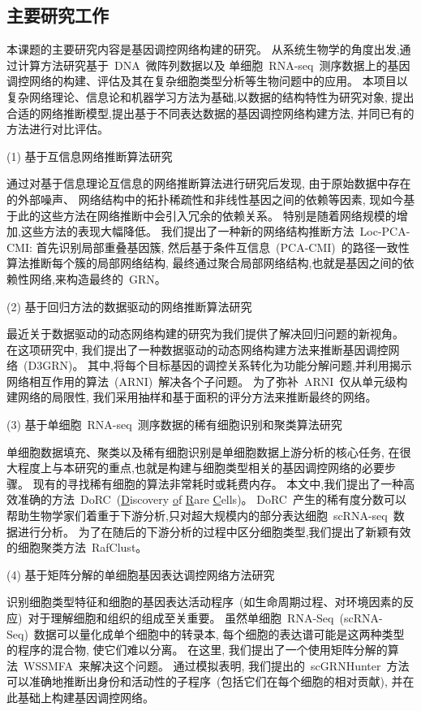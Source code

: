 \subsection{主要研究工作}
本课题的主要研究内容是基因调控网络构建的研究。
从系统生物学的角度出发,通过计算方法研究基于~DNA~微阵列数据以及
单细胞~RNA-seq~测序数据上的基因调控网络的构建、评估及其在复杂细胞类型分析等生物问题中的应用。
本项目以复杂网络理论、信息论和机器学习方法为基础,以数据的结构特性为研究对象,
提出合适的网络推断模型,提出基于不同表达数据的基因调控网络构建方法,
并同已有的方法进行对比评估。

(1) 基于互信息网络推断算法研究

通过对基于信息理论互信息的网络推断算法进行研究后发现,
由于原始数据中存在的外部噪声、
网络结构中的拓扑稀疏性和非线性基因之间的依赖等因素,
现如今基于此的这些方法在网络推断中会引入冗余的依赖关系。
特别是随着网络规模的增加,这些方法的表现大幅降低。
我们提出了一种新的网络结构推断方法~Loc-PCA-CMI:
首先识别局部重叠基因簇,
然后基于条件互信息~(PCA-CMI)~的路径一致性算法推断每个簇的局部网络结构,
最终通过聚合局部网络结构,也就是基因之间的依赖性网络,来构造最终的~GRN。

(2) 基于回归方法的数据驱动的网络推断算法研究

最近关于数据驱动的动态网络构建的研究为我们提供了解决回归问题的新视角。
在这项研究中, 我们提出了一种数据驱动的动态网络构建方法来推断基因调控网络~(D3GRN)。
其中,将每个目标基因的调控关系转化为功能分解问题,并利用揭示网络相互作用的算法~(ARNI)~解决各个子问题。
为了弥补~ARNI~仅从单元级构建网络的局限性,
我们采用抽样和基于面积的评分方法来推断最终的网络。


(3) 基于单细胞~RNA-seq~测序数据的稀有细胞识别和聚类算法研究

单细胞数据填充、聚类以及稀有细胞识别是单细胞数据上游分析的核心任务, 
在很大程度上与本研究的重点,也就是构建与细胞类型相关的基因调控网络的必要步骤。
现有的寻找稀有细胞的算法非常耗时或耗费内存。
本文中,我们提出了一种高效准确的方法~DoRC~(\underline{D}iscovery \underline{o}f \underline{R}are \underline{C}ells)。
DoRC~产生的稀有度分数可以帮助生物学家们着重于下游分析,只对超大规模内的部分表达细胞~scRNA-seq~数据进行分析。
为了在随后的下游分析的过程中区分细胞类型,我们提出了新颖有效的细胞聚类方法~RafClust。

(4) 基于矩阵分解的单细胞基因表达调控网络方法研究

识别细胞类型特征和细胞的基因表达活动程序~(如生命周期过程、对环境因素的反应)~对于理解细胞和组织的组成至关重要。
虽然单细胞~RNA-Seq~(scRNA-Seq)~数据可以量化成单个细胞中的转录本,
每个细胞的表达谱可能是这两种类型的程序的混合物, 使它们难以分离。
在这里, 我们提出了一个使用矩阵分解的算法~WSSMFA~来解决这个问题。
通过模拟表明, 我们提出的~scGRNHunter~方法可以准确地推断出身份和活动性的子程序~(包括它们在每个细胞的相对贡献), 
并在此基础上构建基因调控网络。

